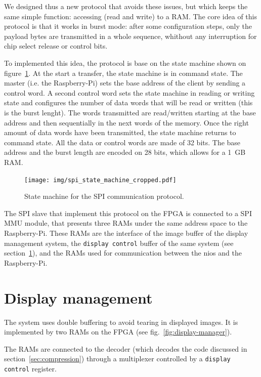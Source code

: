 \documentclass[english, DIV=13]{scrartcl}
\begin{document}
We designed thus a new protocol that avoids these issues, but which keeps the same simple
function: accessing (read and write) to a RAM.
The core idea of this protocol is that it works in burst mode: after some configuration steps,
only the payload bytes are transmitted in a whole sequence, whithout any interruption for
chip select release or control bits.

To implemented this idea, the protocol is base on the state machine shown on figure~\ref{fig:spi}.
At the start a transfer, the state machine is in command state.
The master (i.e. the Raspberry-Pi) sets the base address of the client by
sending a control word. A second control word sets the state machine in reading or writing state
and configures the number of data words that will be read or written (this is the burst lenght).
The words transmitted are read/written starting at the base address and then sequentially in the
next words of the memory.
Once the right amount of data words have been transmitted, the state machine returns to command state.
All the data or control words are made of 32 bits. The base address and the burst length are encoded
on 28 bits, which allows for a \SI{1}{GB} RAM.

\begin{figure}
    \centering
    \texttt{[image: img/spi\_state\_machine\_cropped.pdf]}
    \caption{State machine for the SPI communication protocol.}
    \label{fig:spi}
\end{figure}

The SPI slave that implement this protocol on the FPGA is connected to a SPI MMU module, that presents
three RAMs under the same address space to the Raspberry-Pi.
These RAMs are the interface of the image buffer of the display management system, the \texttt{display control}
buffer of the same system (see section~\ref{sec:display-mngt}), and the RAMs used for communication between the nios
and the Raspberry-Pi.

\section{Display management}
\label{sec:display-mngt}

The system uses double buffering to avoid tearing in displayed images.
It is implemented by two RAMs on the FPGA (see fig.~\ref{fig:display-manager}).

The RAMs are connected to the decoder
(which decodes the code discussed in section~\ref{sec:compression})
through a multiplexer controlled by a \texttt{display control} register.
\end{document}
